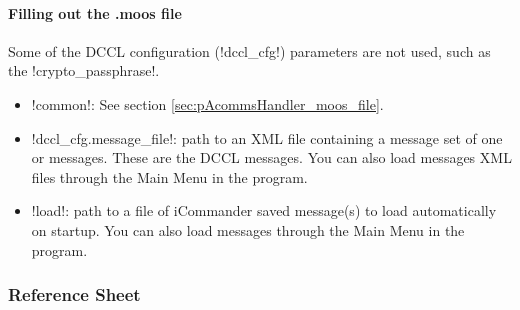 \paragraph{Filling out the .moos file}

Some of the DCCL configuration (!dccl_cfg!) parameters are not used, such as the !crypto_passphrase!. 

\begin{itemize}
\item !common!: See section \ref{sec:pAcommsHandler_moos_file}.
\item !dccl_cfg.message_file!: path to an XML file containing a message set of one or messages. These are the DCCL messages. You can also load messages XML files through the Main Menu in the program.
\item !load!: path to a file of iCommander saved message(s) to load automatically on startup. You can also load messages through the Main Menu in the program.
\end{itemize}

\subsubsection{Reference Sheet}
